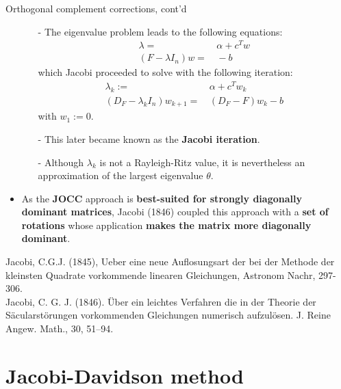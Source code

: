 \documentclass[t,usepdftitle=false]{beamer}
\begin{document}
\begin{frame}{Orthogonal complement corrections, cont'd}
\begin{itemize}
\item[]
\begin{itemize}\normalsize
\item[-] The eigenvalue problem leads to the following equations:
\begin{align*}
\lambda=&\,\alpha+c^Tw\\
(F-\lambda I_n)w=&\,-b
\end{align*}
which Jacobi proceeded to solve with the following iteration:
\begin{align*}
\lambda_k:=&\,\alpha+c^Tw_k\\
(D_F-\lambda_k I_n)w_{k+1}=&\,(D_F-F)w_k-b
\end{align*}
with $w_1:=0$.
\item[-] This later became known as the \textbf{Jacobi iteration}.
\item[-] Although $\lambda_k$ is not a Rayleigh-Ritz value, it is nevertheless an approximation of the largest eigenvalue $\theta$.
\end{itemize}
\item As the \textbf{JOCC} approach is \textbf{best-suited for strongly diagonally dominant matrices}, Jacobi (1846) coupled this approach with a \textbf{set of rotations} whose application \textbf{makes the matrix more diagonally dominant}.
\end{itemize}\smallskip
\tiny{Jacobi, C.G.J. (1845), Ueber eine neue Auflosungsart der bei der Methode der kleinsten Quadrate vorkommende linearen Gleichungen, Astronom Nachr, 297-306.}\tinyskip\\
\tiny{Jacobi, C. G. J. (1846). \"{U}ber ein leichtes Verfahren die in der Theorie der S\"{a}cularstörungen vorkommenden Gleichungen numerisch aufzul\"{o}sen. J. Reine Angew. Math., 30, 51–94.}
\end{frame}

\section{Jacobi-Davidson method}
\end{document}
